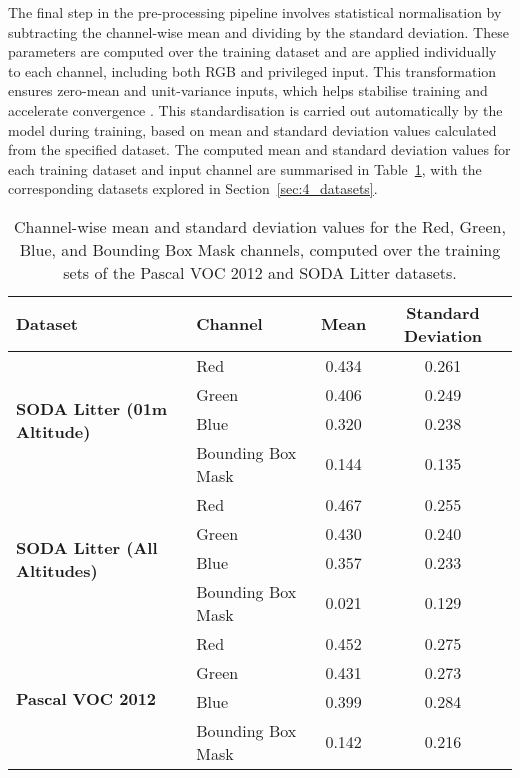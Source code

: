The final step in the pre-processing pipeline involves statistical normalisation by subtracting the channel-wise mean and dividing by the standard deviation. These parameters are computed over the training dataset and are applied individually to each channel, including both RGB and privileged input. This transformation ensures zero-mean and unit-variance inputs, which helps stabilise training and accelerate convergence \cite{min_max_normalisation}. This standardisation is carried out automatically by the model during training, based on mean and standard deviation values calculated from the specified dataset. The computed mean and standard deviation values for each training dataset and input channel are summarised in Table~\ref{tab:channel_stats}, with the corresponding datasets explored in Section~\ref{sec:4_datasets}.

\begin{table}[ht]
    \centering
    \begin{tabular}{llcc}
        \toprule
        \textbf{Dataset} & \textbf{Channel} & \textbf{Mean} & \textbf{Standard Deviation} \\
        \midrule
        \multirow{4}{*}{\textbf{SODA Litter (01m Altitude)}} 
            & Red               & 0.434 & 0.261 \\
            & Green             & 0.406 & 0.249 \\
            & Blue              & 0.320 & 0.238 \\
            & Bounding Box Mask & 0.144 & 0.135 \\
        \midrule
        \multirow{4}{*}{\textbf{SODA Litter (All Altitudes)}} 
            & Red               & 0.467 & 0.255 \\
            & Green             & 0.430 & 0.240 \\
            & Blue              & 0.357 & 0.233 \\
            & Bounding Box Mask & 0.021 & 0.129 \\
        \midrule
        \multirow{4}{*}{\textbf{Pascal VOC 2012}} 
            & Red               & 0.452 & 0.275 \\
            & Green             & 0.431 & 0.273 \\
            & Blue              & 0.399 & 0.284 \\
            & Bounding Box Mask & 0.142 & 0.216 \\
        \bottomrule
    \end{tabular}
    \caption{Channel-wise mean and standard deviation values for the Red, Green, Blue, and Bounding Box Mask channels, computed over the training sets of the Pascal VOC 2012 and SODA Litter datasets.}
    \label{tab:channel_stats}
\end{table}

